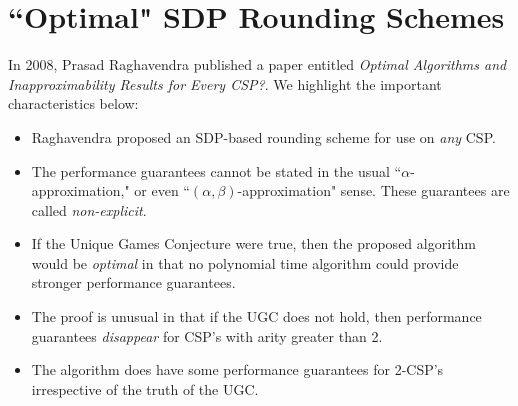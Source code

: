 %
%
%
%
%
\section{``Optimal" SDP Rounding Schemes}
In 2008, Prasad Raghavendra published a paper entitled \textit{Optimal Algorithms and Inapproximability Results for Every CSP?}. We highlight the important characteristics below:

\begin{itemize}
\item Raghavendra proposed an SDP-based rounding scheme for use on \textit{any} CSP.
\item The performance guarantees cannot be stated in the usual ``$\alpha$-approximation," or even ``$(\alpha,\beta)$-approximation" sense.  These guarantees are called \textit{non-explicit}.
\item If the Unique Games Conjecture were true, then the proposed algorithm would be \textit{optimal} in that no polynomial time algorithm could provide stronger performance guarantees.
\item The proof is unusual in that if the UGC does not hold, then performance guarantees \textit{disappear} for CSP's with arity greater than 2.
\item The algorithm does have some performance guarantees for 2-CSP's irrespective of the truth of the UGC.
\end{itemize}

